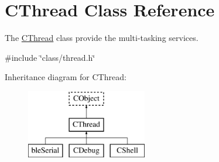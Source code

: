 \hypertarget{class_c_thread}{\section{C\-Thread Class Reference}
\label{class_c_thread}
}


The \hyperlink{class_c_thread}{C\-Thread} class provide the multi-\/tasking services.  




{\ttfamily \#include \char`\"{}class/thread.\-h\char`\"{}}

Inheritance diagram for C\-Thread\-:\begin{figure}[H]
\begin{center}
\leavevmode
\includegraphics[height=3.000000cm]{class_c_thread}
\end{center}
\end{figure}
